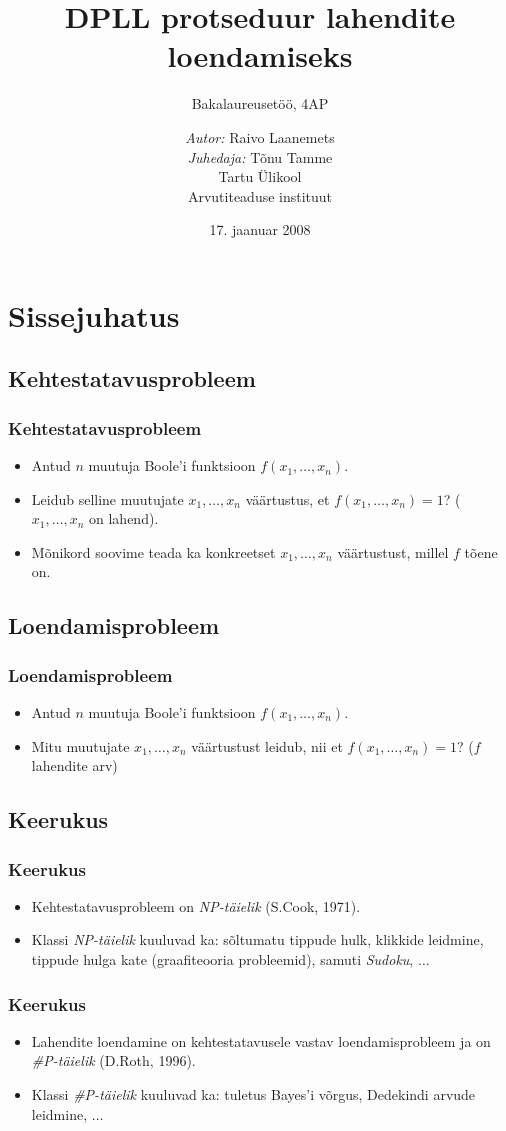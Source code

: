 \documentclass{beamer}
\title{DPLL protseduur lahendite loendamiseks}
\subtitle{Bakalaureusetöö, 4AP}
\author{
	\textit{Autor:} Raivo Laanemets \\
	\textit{Juhedaja:} Tõnu Tamme \\
    Tartu Ülikool \\
    Arvutiteaduse instituut
}
\date{17. jaanuar 2008}
\begin{document}
\frame{\titlepage}

\section{Sissejuhatus}
\subsection{Kehtestatavusprobleem}
\frame
{
	\frametitle{Kehtestatavusprobleem}
	
	
	\begin{itemize}
		\item Antud $n$ muutuja Boole'i funktsioon $f(x_1,\dots,x_n)$.
		\item Leidub selline muutujate $x_1,\dots,x_n$ väärtustus, et
		$f(x_1,\dots,x_n)=1$? ($x_1,\dots,x_n$ on lahend).
		\item Mõnikord soovime teada ka konkreetset $x_1,\dots,x_n$ väärtustust,
		millel $f$ tõene on.
	\end{itemize}
}
\subsection{Loendamisprobleem}
\frame
{
	\frametitle{Loendamisprobleem}
	
	\begin{itemize}
		\item Antud $n$ muutuja Boole'i funktsioon $f(x_1,\dots,x_n)$.
		\item Mitu muutujate $x_1,\dots,x_n$ väärtustust leidub, nii et
		$f(x_1,\dots,x_n)=1$? ($f$ lahendite arv)
	\end{itemize}
}
\subsection{Keerukus}
\frame
{
	\frametitle{Keerukus}
	
	\begin{itemize}
		\item Kehtestatavusprobleem on \emph{NP-täielik} (S.Cook, 1971).
		\item Klassi \emph{NP-täielik} kuuluvad ka:
		sõltumatu tippude hulk, klikkide leidmine, tippude hulga kate (graafiteooria
		probleemid), samuti \emph{Sudoku}, $\dots$
	\end{itemize}
}
\frame
{
	\frametitle{Keerukus}
	
	\begin{itemize}
		\item Lahendite loendamine on kehtestatavusele vastav loendamisprobleem ja on
		\emph{\#P-täielik} (D.Roth, 1996).
		\item Klassi \emph{\#P-täielik} kuuluvad ka:
		tuletus Bayes'i võrgus, Dedekindi arvude leidmine, $\dots$
	\end{itemize}
}
\end{document}
